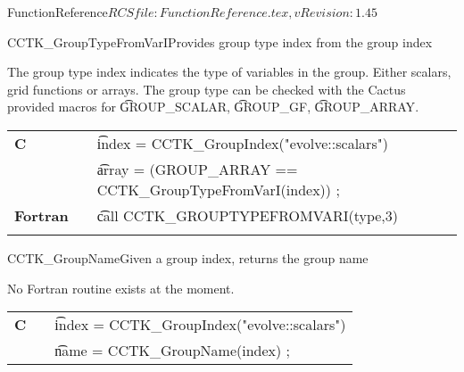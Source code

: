 \begin{cactuspart}{5}{FunctionReference}{$RCSfile: FunctionReference.tex,v $}{$Revision: 1.45 $}
\begin{CCTKFunc}{CCTK\_GroupTypeFromVarI}{Provides group type index from the group index}
\label{CCTK-GroupTypeFromVarI}
\showargs
\begin{params}
\end{params}
\begin{discussion}
The group type index indicates the type of variables in the group.
Either scalars, grid functions or arrays. The group type can be checked
with the Cactus provided macros for {\t GROUP\_SCALAR}, {\t GROUP\_GF}, {\t GROUP\_ARRAY}.
\end{discussion}
\begin{examples}
\begin{tabular}{@{}p{3cm}cp{11cm}}
\hfill {\bf C} && {\t index = CCTK\_GroupIndex("evolve::scalars")}\\
               &&{\t array = (GROUP\_ARRAY == CCTK\_GroupTypeFromVarI(index)) ;}
\\
\hfill {\bf Fortran} && {\t call CCTK\_GROUPTYPEFROMVARI(type,3)}\\
\\
\end{tabular}
\end{examples}
\begin{errorcodes}
\end{errorcodes}
\end{CCTKFunc}




\begin{CCTKFunc}{CCTK\_GroupName}{Given a group index, returns the group name}
\label{CCTK-GroupName}
\showcargs
\begin{params}
\end{params}
\begin{discussion}
No Fortran routine exists at the moment.
\end{discussion}
\begin{examples}
\begin{tabular}{@{}p{3cm}cp{11cm}}
\hfill {\bf C} && {\t index = CCTK\_GroupIndex("evolve::scalars")}\\
               &&{\t name = CCTK\_GroupName(index) ;}
\\
\end{tabular}
\end{examples}
\begin{errorcodes}
\end{errorcodes}
\end{CCTKFunc}






\end{cactuspart}
